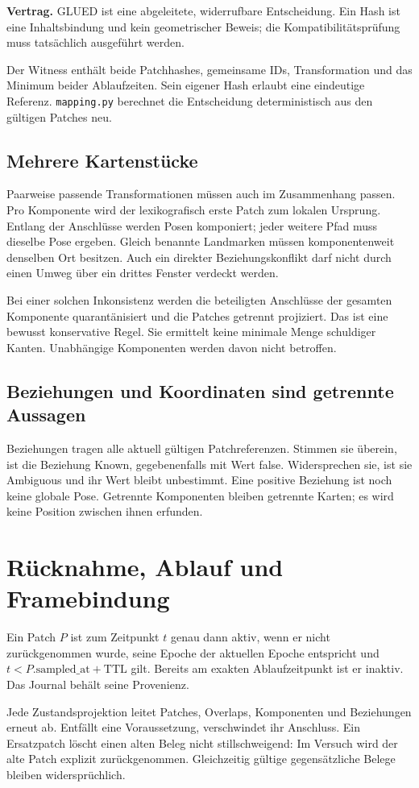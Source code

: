 \documentclass[11pt,a4paper]{article}
\newcommand{\contract}[1]{\vspace{3pt}\noindent\colorbox{pale}{\parbox{\dimexpr\linewidth-2\fboxsep}{\textbf{Vertrag.} #1}}\vspace{5pt}}
\newcommand{\nextsection}[2]{\clearpage{\color{accent}\small\textsf{#1}}\section{#2}}
\begin{document}
\contract{GLUED ist eine abgeleitete, widerrufbare Entscheidung.
Ein Hash ist eine Inhaltsbindung und kein geometrischer Beweis;
die Kompatibilitätsprüfung muss tatsächlich ausgeführt werden.}

Der Witness enthält beide Patchhashes, gemeinsame IDs,
Transformation und das Minimum beider Ablaufzeiten. Sein eigener
Hash erlaubt eine eindeutige Referenz. \texttt{mapping.py} berechnet
die Entscheidung deterministisch aus den gültigen Patches neu.

\subsection{Mehrere Kartenstücke}
Paarweise passende Transformationen müssen auch im Zusammenhang
passen. Pro Komponente wird der lexikografisch erste Patch zum
lokalen Ursprung. Entlang der Anschlüsse werden Posen komponiert;
jeder weitere Pfad muss dieselbe Pose ergeben. Gleich benannte
Landmarken müssen komponentenweit denselben Ort besitzen.
Auch ein direkter Beziehungskonflikt darf nicht durch einen Umweg
über ein drittes Fenster verdeckt werden.

Bei einer solchen Inkonsistenz werden die beteiligten Anschlüsse
der gesamten Komponente quarantänisiert und die Patches getrennt
projiziert. Das ist eine bewusst konservative Regel. Sie ermittelt
keine minimale Menge schuldiger Kanten. Unabhängige Komponenten
werden davon nicht betroffen.

\subsection{Beziehungen und Koordinaten sind getrennte Aussagen}
Beziehungen tragen alle aktuell gültigen Patchreferenzen. Stimmen
sie überein, ist die Beziehung Known, gegebenenfalls mit Wert false.
Widersprechen sie, ist sie Ambiguous und ihr Wert bleibt unbestimmt.
Eine positive Beziehung ist noch keine globale Pose. Getrennte
Komponenten bleiben getrennte Karten; es wird keine Position
zwischen ihnen erfunden.

\nextsection{31 / REVALIDIERUNG}{Rücknahme, Ablauf und Framebindung}
Ein Patch $P$ ist zum Zeitpunkt $t$ genau dann aktiv, wenn er nicht
zurückgenommen wurde, seine Epoche der aktuellen Epoche entspricht
und $t<P.\mathrm{sampled\_at}+\mathrm{TTL}$ gilt. Bereits am exakten
Ablaufzeitpunkt ist er inaktiv. Das Journal behält seine Provenienz.

Jede Zustandsprojektion leitet Patches, Overlaps, Komponenten und
Beziehungen erneut ab. Entfällt eine Voraussetzung, verschwindet
ihr Anschluss. Ein Ersatzpatch löscht einen alten Beleg nicht
stillschweigend: Im Versuch wird der alte Patch explizit zurückgenommen.
Gleichzeitig gültige gegensätzliche Belege bleiben widersprüchlich.
\end{document}

